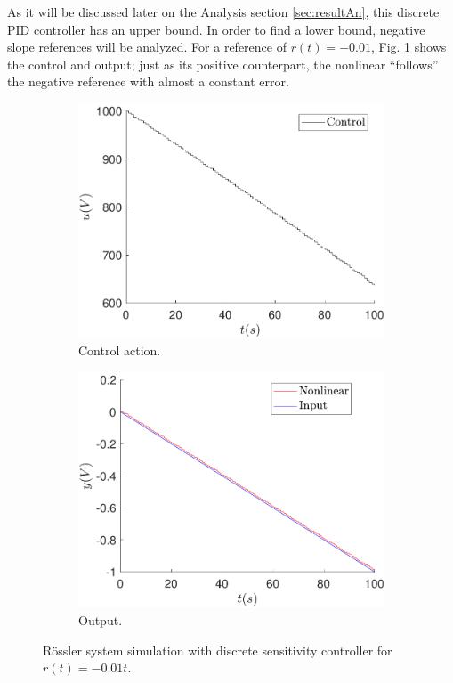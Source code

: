     As it will be discussed later on the Analysis section \ref{sec:resultAn}, this discrete PID controller has an upper bound. In order to find a lower bound, negative slope references will be analyzed. For a reference of $r(t)=-0.01$, Fig. \ref{fig:sens_ref_-0_01t} shows the control and output; just as its positive counterpart, the nonlinear ``follows'' the negative reference with almost a constant error.
    
    \begin{figure}
        \centering
        \begin{subfigure}[b]{0.475\textwidth}
            \centering
            \includegraphics[scale=0.425]{files/heuristic/Sensitivity/control_sens_ramp_ref_-0_01.pdf}
            \caption{Control action.}
        \end{subfigure}
        \vskip0.1cm
        \begin{subfigure}[b]{0.475\textwidth}   
            \centering 
            \includegraphics[scale=0.425]{files/heuristic/Sensitivity/sens_ramp_ref_-0_01.pdf}
            \caption{Output.}
        \end{subfigure}
        \caption{Rössler system simulation with discrete sensitivity controller for $r(t)=-0.01t$.}
        \label{fig:sens_ref_-0_01t}
	\end{figure}
	
